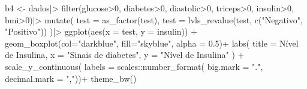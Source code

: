 \documentclass[
  letterpaper,
  DIV=11,
  numbers=noendperiod]{scrartcl}
\newenvironment{Shaded}{\begin{snugshade}}{\end{snugshade}}
\newcommand{\AttributeTok}[1]{\textcolor[rgb]{0.40,0.45,0.13}{#1}}
\newcommand{\DecValTok}[1]{\textcolor[rgb]{0.68,0.00,0.00}{#1}}
\newcommand{\FloatTok}[1]{\textcolor[rgb]{0.68,0.00,0.00}{#1}}
\newcommand{\FunctionTok}[1]{\textcolor[rgb]{0.28,0.35,0.67}{#1}}
\newcommand{\NormalTok}[1]{\textcolor[rgb]{0.00,0.23,0.31}{#1}}
\newcommand{\OtherTok}[1]{\textcolor[rgb]{0.00,0.23,0.31}{#1}}
\newcommand{\SpecialCharTok}[1]{\textcolor[rgb]{0.37,0.37,0.37}{#1}}
\newcommand{\StringTok}[1]{\textcolor[rgb]{0.13,0.47,0.30}{#1}}
\begin{document}
\begin{Shaded}
\begin{Highlighting}[]
\NormalTok{b4 }\OtherTok{\textless{}{-}}\NormalTok{ dados}\SpecialCharTok{|\textgreater{}}
  \FunctionTok{filter}\NormalTok{(glucose}\SpecialCharTok{\textgreater{}}\DecValTok{0}\NormalTok{, diabetes}\SpecialCharTok{\textgreater{}}\DecValTok{0}\NormalTok{, diastolic}\SpecialCharTok{\textgreater{}}\DecValTok{0}\NormalTok{,}
\NormalTok{         triceps}\SpecialCharTok{\textgreater{}}\DecValTok{0}\NormalTok{, insulin}\SpecialCharTok{\textgreater{}}\DecValTok{0}\NormalTok{, bmi}\SpecialCharTok{\textgreater{}}\DecValTok{0}\NormalTok{)}\SpecialCharTok{|\textgreater{}}
  \FunctionTok{mutate}\NormalTok{(}
    \AttributeTok{test =} \FunctionTok{as\_factor}\NormalTok{(test),}
    \AttributeTok{test =} \FunctionTok{lvls\_revalue}\NormalTok{(test, }\FunctionTok{c}\NormalTok{(}\StringTok{"Negativo"}\NormalTok{, }\StringTok{"Positivo"}\NormalTok{))}
\NormalTok{  )}\SpecialCharTok{|\textgreater{}}
  \FunctionTok{ggplot}\NormalTok{(}\FunctionTok{aes}\NormalTok{(}\AttributeTok{x =}\NormalTok{ test, }\AttributeTok{y =}\NormalTok{ insulin)) }\SpecialCharTok{+}
  \FunctionTok{geom\_boxplot}\NormalTok{(}\AttributeTok{col=}\StringTok{"darkblue"}\NormalTok{, }\AttributeTok{fill=}\StringTok{"skyblue"}\NormalTok{, }\AttributeTok{alpha =} \FloatTok{0.5}\NormalTok{)}\SpecialCharTok{+}
  \FunctionTok{labs}\NormalTok{(}
    \AttributeTok{title =} \StringTok{\textquotesingle{}Nível de Insulina\textquotesingle{}}\NormalTok{,}
    \AttributeTok{x =} \StringTok{"Sinais de diabetes"}\NormalTok{,}
    \AttributeTok{y =} \StringTok{"Nível de Insulina"}
\NormalTok{  ) }\SpecialCharTok{+}
  \FunctionTok{scale\_y\_continuous}\NormalTok{(}
    \AttributeTok{labels =}\NormalTok{ scales}\SpecialCharTok{::}\FunctionTok{number\_format}\NormalTok{(}
      \AttributeTok{big.mark =} \StringTok{"."}\NormalTok{,}
      \AttributeTok{decimal.mark =} \StringTok{","}\NormalTok{))}\SpecialCharTok{+}
  \FunctionTok{theme\_bw}\NormalTok{()}


\end{Highlighting}
\end{Shaded}
\end{document}
